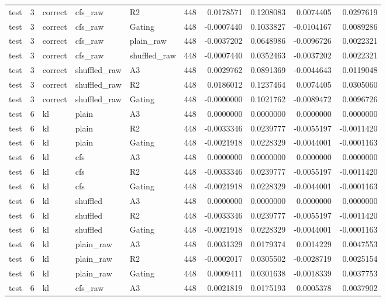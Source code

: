 \begin{tabular}{lrlllrrrrr}
test & 3 & correct & cfs_raw & R2 & 448 & 0.0178571 & 0.1208083 & 0.0074405 & 0.0297619 \\
test & 3 & correct & cfs_raw & Gating & 448 & -0.0007440 & 0.1033827 & -0.0104167 & 0.0089286 \\
test & 3 & correct & cfs_raw & plain_raw & 448 & -0.0037202 & 0.0648986 & -0.0096726 & 0.0022321 \\
test & 3 & correct & cfs_raw & shuffled_raw & 448 & -0.0007440 & 0.0352463 & -0.0037202 & 0.0022321 \\
test & 3 & correct & shuffled_raw & A3 & 448 & 0.0029762 & 0.0891369 & -0.0044643 & 0.0119048 \\
test & 3 & correct & shuffled_raw & R2 & 448 & 0.0186012 & 0.1237464 & 0.0074405 & 0.0305060 \\
test & 3 & correct & shuffled_raw & Gating & 448 & -0.0000000 & 0.1021762 & -0.0089472 & 0.0096726 \\
test & 6 & kl & plain & A3 & 448 & 0.0000000 & 0.0000000 & 0.0000000 & 0.0000000 \\
test & 6 & kl & plain & R2 & 448 & -0.0033346 & 0.0239777 & -0.0055197 & -0.0011420 \\
test & 6 & kl & plain & Gating & 448 & -0.0021918 & 0.0228329 & -0.0044001 & -0.0001163 \\
test & 6 & kl & cfs & A3 & 448 & 0.0000000 & 0.0000000 & 0.0000000 & 0.0000000 \\
test & 6 & kl & cfs & R2 & 448 & -0.0033346 & 0.0239777 & -0.0055197 & -0.0011420 \\
test & 6 & kl & cfs & Gating & 448 & -0.0021918 & 0.0228329 & -0.0044001 & -0.0001163 \\
test & 6 & kl & shuffled & A3 & 448 & 0.0000000 & 0.0000000 & 0.0000000 & 0.0000000 \\
test & 6 & kl & shuffled & R2 & 448 & -0.0033346 & 0.0239777 & -0.0055197 & -0.0011420 \\
test & 6 & kl & shuffled & Gating & 448 & -0.0021918 & 0.0228329 & -0.0044001 & -0.0001163 \\
test & 6 & kl & plain_raw & A3 & 448 & 0.0031329 & 0.0179374 & 0.0014229 & 0.0047553 \\
test & 6 & kl & plain_raw & R2 & 448 & -0.0002017 & 0.0305502 & -0.0028719 & 0.0025154 \\
test & 6 & kl & plain_raw & Gating & 448 & 0.0009411 & 0.0301638 & -0.0018339 & 0.0037753 \\
test & 6 & kl & cfs_raw & A3 & 448 & 0.0021819 & 0.0175193 & 0.0005378 & 0.0037902 \\

\end{tabular}
